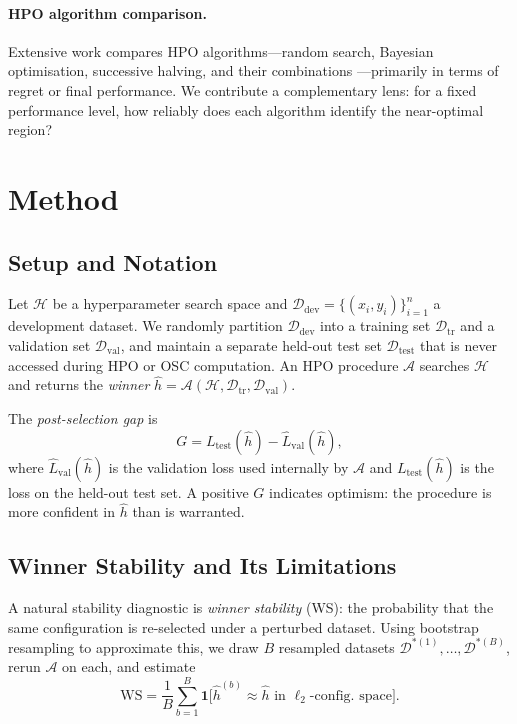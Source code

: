 \documentclass[twoside]{article}
\newcommand{\WS}{\mathrm{WS}}
\newcommand{\Ddev}{\mathcal{D}_{\mathrm{dev}}}
\newcommand{\hhat}{\hat{h}}
\newcommand{\Lval}{\hat{L}_{\mathrm{val}}}
\newcommand{\Ltest}{L_{\mathrm{test}}}
\begin{document}
\paragraph{HPO algorithm comparison.}
Extensive work compares HPO algorithms---random search, Bayesian
optimisation, successive halving, and their combinations
\citep{bergstra2012random, snoek2012practical, li2018hyperband,
falkner2018bohb}---primarily in terms of regret or final performance.
We contribute a complementary lens: for a fixed performance level, how
reliably does each algorithm identify the near-optimal region?

\section{Method}
\label{sec:method}

\subsection{Setup and Notation}
\label{sec:setup}

Let $\mathcal{H}$ be a hyperparameter search space and
$\Ddev = \{(x_i, y_i)\}_{i=1}^n$ a development dataset. We randomly
partition $\Ddev$ into a training set $\mathcal{D}_\mathrm{tr}$ and a
validation set $\mathcal{D}_\mathrm{val}$, and maintain a separate
held-out test set $\mathcal{D}_\mathrm{test}$ that is never accessed
during HPO or OSC computation. An HPO procedure $\mathcal{A}$ searches
$\mathcal{H}$ and returns the \emph{winner}
$\hhat = \mathcal{A}(\mathcal{H}, \mathcal{D}_\mathrm{tr},
\mathcal{D}_\mathrm{val})$.

The \emph{post-selection gap} is
\begin{equation}
  G = \Ltest(\hhat) - \Lval(\hhat),
\end{equation}
where $\Lval(\hhat)$ is the validation loss used internally by $\mathcal{A}$
and $\Ltest(\hhat)$ is the loss on the held-out test set.
A positive $G$ indicates optimism: the procedure is more confident in
$\hhat$ than is warranted.

\subsection{Winner Stability and Its Limitations}
\label{sec:ws}

A natural stability diagnostic is \emph{winner stability} (WS): the
probability that the same configuration is re-selected under a perturbed
dataset. Using bootstrap resampling to approximate this, we draw $B$
resampled datasets $\mathcal{D}^{*(1)}, \ldots, \mathcal{D}^{*(B)}$,
rerun $\mathcal{A}$ on each, and estimate
\begin{equation}
  \WS = \frac{1}{B}\sum_{b=1}^{B}
    \mathbf{1}\bigl[\hhat^{(b)} \approx \hhat
    \text{ in } \ell_2\text{-config.\ space}\bigr].
\end{equation}
\end{document}
